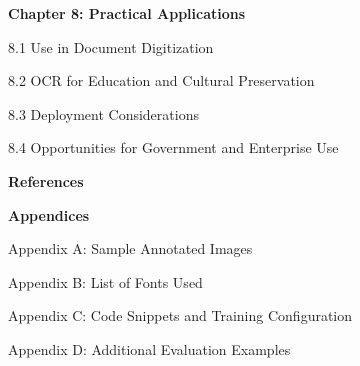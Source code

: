 \begin{adjustwidth}{0.2cm}{0.2cm}
    \vspace{0.5cm}
    {\large \textbf{Chapter 8: Practical Applications}\dotfill\pageref{ch:applications}\par}
    {\large 8.1 Use in Document Digitization\dotfill\pageref{sec:digitization}\par}
    {\large 8.2 OCR for Education and Cultural Preservation\dotfill\pageref{sec:preservation}\par}
    {\large 8.3 Deployment Considerations\dotfill\pageref{sec:deployment}\par}
    {\large 8.4 Opportunities for Government and Enterprise Use\dotfill\pageref{sec:opportunities}\par}

    \vspace{0.5cm}
    {\large \textbf{References}\dotfill\pageref{ch:references}\par}

    \vspace{0.5cm}
    {\large \textbf{Appendices}\par}
    {\large Appendix A: Sample Annotated Images\dotfill\pageref{appendix-a}\par}
    {\large Appendix B: List of Fonts Used\dotfill\pageref{appendix-b}\par}
    {\large Appendix C: Code Snippets and Training Configuration\dotfill\pageref{appendix-c}\par}
    {\large Appendix D: Additional Evaluation Examples\dotfill\pageref{appendix-d}\par}

\end{adjustwidth}
